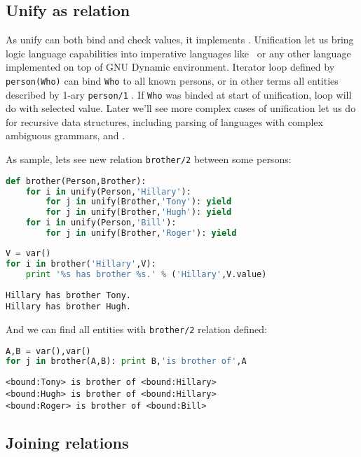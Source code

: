\subsection{Unify as relation}

As unify can both bind and check values, it implements .
Unification let us bring logic language capabilities into imperative
languages like \py\ or any other language implemented on top of
GNU Dynamic environment. Iterator loop defined by \verb|person(Who)|
can bind \verb|Who| to all known persons, or in other terms all entities
described by 1-ary \verb|person/1| . If \verb|Who| was binded
at start of unification, loop will do  with selected
value. Later we'll see more complex cases of unification let us do
 for recursive data structures, including
parsing of languages with complex ambiguous grammars, and .

As sample, lets see new relation \verb|brother/2| between some persons:
\begin{lstlisting}[language=Python]
def brother(Person,Brother):
	for i in unify(Person,'Hillary'):
		for j in unify(Brother,'Tony'): yield
		for j in unify(Brother,'Hugh'): yield
	for i in unify(Person,'Bill'):
		for j in unify(Brother,'Roger'): yield
\end{lstlisting}
\begin{lstlisting}[language=Python]
V = var()
for i in brother('Hillary',V):
	print '%s has brother %s.' % ('Hillary',V.value)
\end{lstlisting}
\begin{lstlisting}
Hillary has brother Tony.
Hillary has brother Hugh.
\end{lstlisting}
And we can find all entities with \verb|brother/2| relation defined:
\begin{lstlisting}[language=Python]
A,B = var(),var()
for j in brother(A,B): print B,'is brother of',A
\end{lstlisting}
\begin{lstlisting}
<bound:Tony> is brother of <bound:Hillary>
<bound:Hugh> is brother of <bound:Hillary>
<bound:Roger> is brother of <bound:Bill>
\end{lstlisting}

\subsection{Joining relations}

